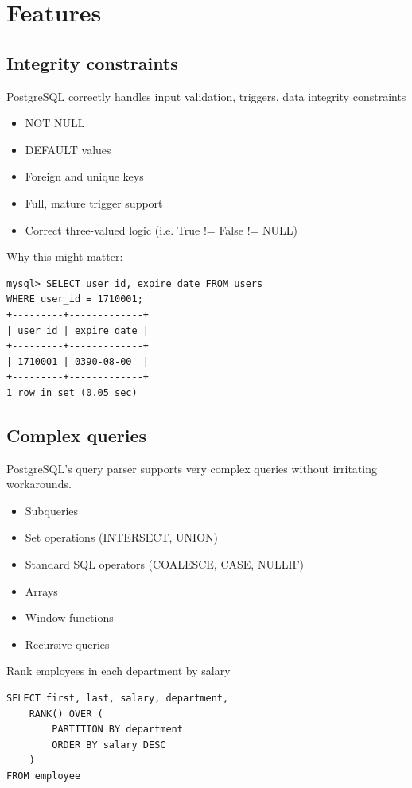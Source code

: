 \documentclass[svgnames]{beamer}
\begin{document}
\section{Features}
\subsection{Integrity constraints}
\begin{frame}[fragile]
PostgreSQL correctly handles input validation, triggers, data integrity constraints
\begin{itemize}
    \item NOT NULL
    \item DEFAULT values
    \item Foreign and unique keys
    \item Full, mature trigger support
    \item Correct three-valued logic (i.e. True != False != NULL)
\end{itemize}
Why this might matter:
\small
\begin{verbatim}
mysql> SELECT user_id, expire_date FROM users
WHERE user_id = 1710001;
+---------+-------------+
| user_id | expire_date |
+---------+-------------+
| 1710001 | 0390-08-00  | 
+---------+-------------+
1 row in set (0.05 sec)
\end{verbatim}
\normalsize
\end{frame}

\subsection{Complex queries}
\begin{frame}
PostgreSQL's query parser supports very complex queries without irritating workarounds.
\begin{itemize}
    \item Subqueries
    \item Set operations (INTERSECT, UNION)
    \item Standard SQL operators (COALESCE, CASE, NULLIF)
    \item Arrays
    \item Window functions
    \item Recursive queries
\end{itemize}
\end{frame}

\begin{frame}[fragile]
    Rank employees in each department by salary
    \begin{verbatim}
SELECT first, last, salary, department,
    RANK() OVER (
        PARTITION BY department
        ORDER BY salary DESC
    )
FROM employee
    \end{verbatim}
\end{frame}
\end{document}
